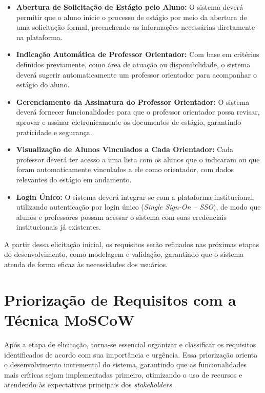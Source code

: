 \begin{itemize}
    \item \textbf{Abertura de Solicitação de Estágio pelo Aluno:} O sistema deverá permitir que o aluno inicie o processo de estágio por meio da abertura de uma solicitação formal, preenchendo as informações necessárias diretamente na plataforma.
    
    \item \textbf{Indicação Automática de Professor Orientador:} Com base em critérios definidos previamente, como área de atuação ou disponibilidade, o sistema deverá sugerir automaticamente um professor orientador para acompanhar o estágio do aluno.
    
    \item \textbf{Gerenciamento da Assinatura do Professor Orientador:} O sistema deverá fornecer funcionalidades para que o professor orientador possa revisar, aprovar e assinar eletronicamente os documentos de estágio, garantindo praticidade e segurança.
    
    \item \textbf{Visualização de Alunos Vinculados a Cada Orientador:} Cada professor deverá ter acesso a uma lista com os alunos que o indicaram ou que foram automaticamente vinculados a ele como orientador, com dados relevantes do estágio em andamento.
    
    \item \textbf{Login Único:} O sistema deverá integrar-se com a plataforma institucional, utilizando autenticação por login único (\textit{Single Sign-On – SSO}), de modo que alunos e professores possam acessar o sistema com suas credenciais institucionais já existentes.
\end{itemize}

A partir dessa elicitação inicial, os requisitos serão refinados nas próximas etapas do desenvolvimento, como modelagem e validação, garantindo que o sistema atenda de forma eficaz às necessidades dos usuários.


\section{Priorização de Requisitos com a Técnica MoSCoW}

Após a etapa de elicitação, torna-se essencial organizar e classificar os requisitos identificados de acordo com sua importância e urgência. Essa priorização orienta o desenvolvimento incremental do sistema, garantindo que as funcionalidades mais críticas sejam implementadas primeiro, otimizando o uso de recursos e atendendo às expectativas principais dos \textit{stakeholders} \cite{pressman2016engenharia}.


